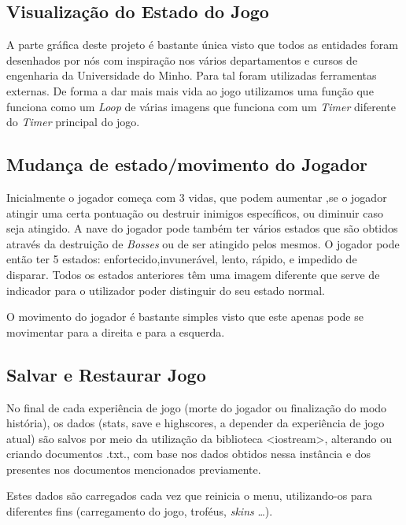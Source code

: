 \documentclass[a4paper,11pt]{article}
\newcommand\tab[1][0.8cm]{\hspace*{#1}}
\begin{document}
\subsection{Visualização do Estado do Jogo}
\tab A parte gráfica deste projeto é bastante única visto que todos as entidades foram desenhados por nós com inspiração nos vários departamentos e cursos de engenharia da Universidade do Minho. Para tal foram utilizadas ferramentas externas. De forma a dar mais mais vida ao jogo utilizamos uma função que funciona como um \textit{Loop} de várias imagens que funciona com um \textit{Timer} diferente do \textit{Timer} principal do jogo.

\subsection{Mudança de estado/movimento do Jogador}
\tab Inicialmente o jogador começa com 3 vidas, que podem aumentar ,se o jogador atingir uma certa pontuação ou destruir inimigos específicos, ou diminuir caso seja atingido. A nave do jogador pode também ter vários estados que são obtidos através da destruição de \textit{Bosses} ou de ser atingido pelos mesmos. O jogador pode então ter 5 estados: enfortecido,invunerável, lento, rápido, e impedido de disparar. Todos os estados anteriores têm uma imagem diferente que serve de indicador para o utilizador poder distinguir do seu  estado normal.

\vspace{8pt}
O movimento do jogador é bastante simples visto que este apenas pode se movimentar para a direita e para a esquerda.
\pagebreak

\subsection{Salvar e Restaurar Jogo}

\vspace{8pt}

No final de cada experiência de jogo (morte do jogador ou finalização do modo história), os dados (stats, save e highscores, a depender da experiência de jogo atual) são salvos por meio da utilização da biblioteca <iostream>, alterando ou criando documentos .txt., com base nos dados obtidos nessa instância e dos presentes nos documentos mencionados previamente.

\vspace{8pt}

Estes dados são carregados cada vez que reinicia o menu, utilizando-os para diferentes fins (carregamento do jogo, troféus, \textit{skins} \dots).
\end{document}
